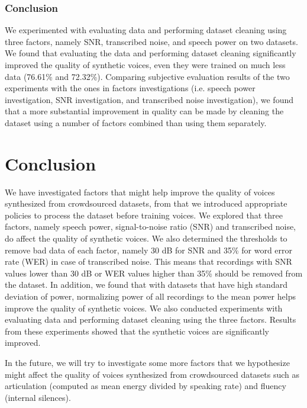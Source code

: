 \documentclass[12pt]{article}
\begin{document}
\subsubsection{Conclusion}
We experimented with evaluating data and performing dataset cleaning using three factors, namely SNR, transcribed noise, and speech power on two datasets. We found that evaluating the data and performing dataset cleaning significantly improved the quality of synthetic voices, even they were trained on much less data (76.61\% and 72.32\%). Comparing subjective evaluation results of the two experiments with the ones in factors investigations (i.e. speech power investigation, SNR investigation, and transcribed noise investigation), we found that a more substantial improvement in quality can be made by cleaning the dataset using a number of factors combined than using them separately.



\clearpage

\section{Conclusion}\label{sec_conclusion}
We have investigated factors that might help improve the quality of voices synthesized from crowdsourced datasets, from that we introduced appropriate policies to process the dataset before training voices. We explored that three factors, namely speech power, signal-to-noise ratio (SNR) and transcribed noise, do affect the quality of synthetic voices. We also determined the thresholds to remove bad data of each factor, namely 30 dB for SNR and 35\% for word error rate (WER) in case of transcribed noise. This means that recordings with SNR values lower than 30 dB or WER values higher than 35\% should be removed from the dataset. In addition, we found that with datasets that have high standard deviation of power, normalizing power of all recordings to the mean power helps improve the quality of synthetic voices. We also conducted experiments with evaluating data and performing dataset cleaning using the three factors. Results from these experiments showed that the synthetic voices are significantly improved.

In the future, we will try to investigate some more factors that we hypothesize might affect the quality of voices synthesized from crowdsourced datasets such as articulation (computed as mean energy divided by speaking rate) and fluency (internal silences).
\end{document}
